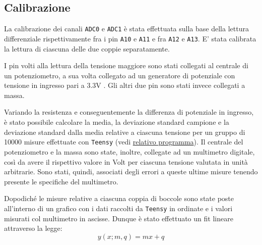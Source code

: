 \documentclass{article}[a4paper, oneside, 11pt]
\begin{document}
\subsection{Calibrazione}\label{sec: cal}

La calibrazione dei canali \verb+ADC0+ e \verb+ADC1+ è stata effettuata
sulla base della lettura differenziale rispettivamente fra i pin \verb+A10+
e \verb+A11+ e fra \verb+A12+ e \verb+A13+. E’ stata calibrata la lettura
di ciascuna delle due coppie separatamente.

I pin volti alla lettura della tensione maggiore sono stati collegati al 
centrale di un potenziometro, a sua volta collegato ad un generatore di 
potenziale con tensione in ingresso pari a 3.3V . Gli altri due pin sono stati 
invece collegati a massa.

Variando la resistenza e conseguentemente la differenza di potenziale in 
ingresso, è stato possibile calcolare la media, la deviazione standard 
campione e la deviazione standard dalla media relative a ciascuna tensione per 
un gruppo di 10000 misure effettuate con \verb+Teensy+ (vedi 
\href{https://github.com/LucaCiucci/relaz_seme/blob/master/sketches/teensy_calib/teensy_calib.ino}{relativo programma}).
Il centrale del potenziometro e la 
massa sono state, inoltre, collegate ad un multimetro digitale, così da avere 
il rispettivo valore in Volt per ciascuna tensione valutata in unità 
arbitrarie. Sono stati, quindi, associati degli errori a queste ultime misure  
tenendo presente le specifiche del multimetro.

Dopodiché le misure relative a ciascuna coppia di boccole sono state poste 
all’interno di un grafico con i dati raccolti da \verb+Teensy+ in ordinate e i 
valori misurati col multimetro in ascisse. Dunque è stato effettuato un fit 
lineare attraverso la legge:
\begin{equation}
y(x; m, q)  = m x + q
\end{equation}
\end{document}
